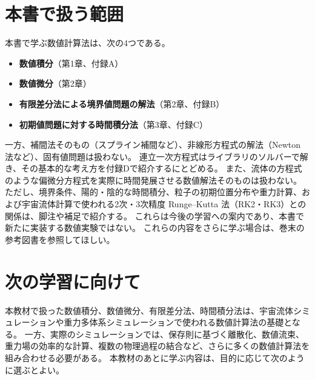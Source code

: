 \section*{本書で扱う範囲}

本書で学ぶ数値計算法は、次の4つである。

\begin{itemize}
  \item \textbf{数値積分}（第1章、付録A）
  \item \textbf{数値微分}（第2章）
  \item \textbf{有限差分法による境界値問題の解法}（第2章、付録B）
  \item \textbf{初期値問題に対する時間積分法}（第3章、付録C）
\end{itemize}

一方、補間法そのもの（スプライン補間など）、非線形方程式の解法（Newton 法など）、固有値問題は扱わない。
連立一次方程式はライブラリのソルバーで解き、その基本的な考え方を付録Dで紹介するにとどめる。
また、流体の方程式のような偏微分方程式を実際に時間発展させる数値解法そのものは扱わない。
ただし、境界条件、陽的・陰的な時間積分、粒子の初期位置分布や重力計算、および宇宙流体計算で使われる2次・3次精度 Runge--Kutta 法（RK2・RK3）との関係は、脚注や補足で紹介する。
これらは今後の学習への案内であり、本書で新たに実装する数値実験ではない。
これらの内容をさらに学ぶ場合は、巻末の参考図書を参照してほしい。

\section*{次の学習に向けて}

本教材で扱った数値積分、数値微分、有限差分法、時間積分法は、宇宙流体シミュレーションや重力多体系シミュレーションで使われる数値計算法の基礎となる。
一方、実際のシミュレーションでは、保存則に基づく離散化、数値流束、重力場の効率的な計算、複数の物理過程の結合など、さらに多くの数値計算法を組み合わせる必要がある。
本教材のあとに学ぶ内容は、目的に応じて次のように選ぶとよい。

